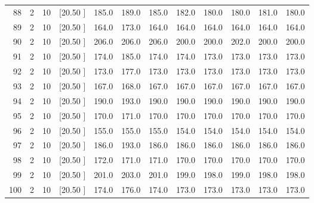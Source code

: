 \documentclass[12pt,a4paper]{article}
\begin{document}
\begin{center}
{\begin{tabular}{r r r r r r r r r r r r}
  88&  2& 10&[20.50     ]&   185.0&   189.0&   185.0&   182.0&   180.0&   180.0&   181.0&   180.0\\[-0.02in]
  89&  2& 10&[20.50     ]&   164.0&   173.0&   164.0&   164.0&   164.0&   164.0&   164.0&   164.0\\[-0.02in]
  90&  2& 10&[20.50     ]&   206.0&   206.0&   206.0&   200.0&   200.0&   202.0&   200.0&   200.0\\[-0.02in]
  91&  2& 10&[20.50     ]&   174.0&   185.0&   174.0&   174.0&   173.0&   173.0&   173.0&   173.0\\[-0.02in]
  92&  2& 10&[20.50     ]&   173.0&   177.0&   173.0&   173.0&   173.0&   173.0&   173.0&   173.0\\[-0.02in]
  93&  2& 10&[20.50     ]&   167.0&   168.0&   167.0&   167.0&   167.0&   167.0&   167.0&   167.0\\[-0.02in]
  94&  2& 10&[20.50     ]&   190.0&   193.0&   190.0&   190.0&   190.0&   190.0&   190.0&   190.0\\[-0.02in]
  95&  2& 10&[20.50     ]&   170.0&   171.0&   170.0&   170.0&   170.0&   170.0&   170.0&   170.0\\[-0.02in]
  96&  2& 10&[20.50     ]&   155.0&   155.0&   155.0&   154.0&   154.0&   154.0&   154.0&   154.0\\[-0.02in]
  97&  2& 10&[20.50     ]&   186.0&   193.0&   186.0&   186.0&   186.0&   186.0&   186.0&   186.0\\[-0.02in]
  98&  2& 10&[20.50     ]&   172.0&   171.0&   171.0&   170.0&   170.0&   170.0&   170.0&   170.0\\[-0.02in]
  99&  2& 10&[20.50     ]&   201.0&   203.0&   201.0&   199.0&   198.0&   199.0&   198.0&   198.0\\[-0.02in]
 100&  2& 10&[20.50     ]&   174.0&   176.0&   174.0&   173.0&   173.0&   173.0&   173.0&   173.0\\[-0.02in]

\hline
\end{tabular}}
\end{center}
\end{document}
